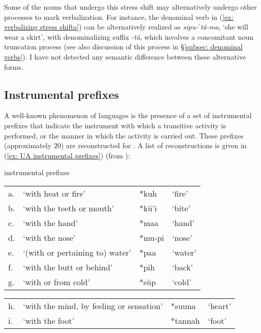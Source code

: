 Some of the nouns that undergo this stress shift may alternatively undergo other processes to mark verbalization. For instance, the denominal verb in (\ref{ex: verbalizing stress shifta}) can be alternatively realized as \textit{sipu-ˈtâ-ma}, `she will wear a skirt', with denominalizing suffix \textit{-tâ}, which involves a concomitant noun truncation process (see also discussion of this process in §\ref{subsec: denominal verbs}). I have not detected any semantic difference between these alternative forms.


\subsection{Instrumental prefixes}
\label{subsec: instrumental prefixes}

A well-known phenomenon of  languages is the presence of a set of instrumental prefixes that indicate the instrument with which a transitive activity is performed, or the manner in which the activity is carried out. These prefixes (approximately 20) are reconstructed for . A list of reconstructions is given in (\ref{ex: UA instrumental prefixes}) (from \citealt[][92]{dayley1989tumpisa}):


\ea\label{ex: UA instrumental prefixes}
{ instrumental prefixes}

\begin{tabular}{llll}
     a. & {‘with heat or fire’}&{*kuh}&{`fire'}\\
     b. & {‘with the teeth or mouth’}&{*kü’i}&{`bite'}\\
     c. & {‘with the hand’}&{*maa}&{`hand'}\\
     d. & {‘with the nose’}&{*mu-pi}&{`nose'}\\
     e. & {‘(with or pertaining to) water’}&{*paa}&{`water'}\\
     f. & {‘with the butt or behind’}&{*pih}&{`back'}\\
     g. & {‘with or from cold’}&{*süp}&{`cold'}\\
\end{tabular}

\begin{tabular}{llll}
     h. & ‘with the mind, by feeling or sensation’&{*suuna}&{`heart'}\\
     i. & {‘with the foot’}&{*tannah}&{`foot'}\\
\end{tabular}

